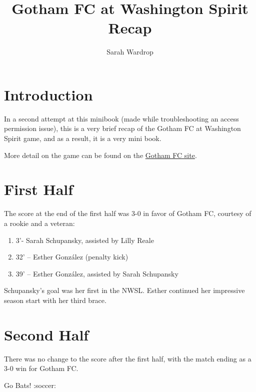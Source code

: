 \documentclass[
  openany]{book}
\title{Gotham FC at Washington Spirit Recap}
\author{Sarah Wardrop}
\date{}
\providecommand{\tightlist}{%
  \setlength{\itemsep}{0pt}\setlength{\parskip}{0pt}}
\begin{document}
\maketitle

{
\setcounter{tocdepth}{1}
\tableofcontents
}
\chapter{Introduction}\label{introduction}

In a second attempt at this minibook (made while troubleshooting an access permission issue), this is a very brief recap of the Gotham FC at Washington Spirit game, and as a result, it is a very mini book.

More detail on the game can be found on the \href{https://www.gothamfc.com/news/gotham-fc-caps-road-swing-with-victory-over-washington-spirit}{Gotham FC site}.

\chapter{First Half}\label{first-half}

The score at the end of the first half was 3-0 in favor of Gotham FC, courtesy of a rookie and a veteran:

\begin{enumerate}
\def\labelenumi{\arabic{enumi}.}
\tightlist
\item
  3'- Sarah Schupansky, assisted by Lilly Reale
\item
  32' -- Esther González (penalty kick)
\item
  39' -- Esther González, assisted by Sarah Schupansky
\end{enumerate}

Schupansky's goal was her first in the NWSL. Esther continued her impressive season start with her third brace.

\chapter{Second Half}\label{second-half}

There was no change to the score after the first half, with the match ending as a 3-0 win for Gotham FC.

Go Bats! :soccer:
\end{document}
